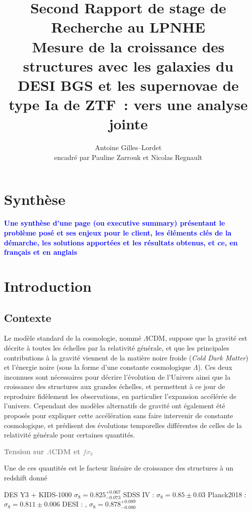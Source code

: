 \documentclass{book}
\title{Second Rapport de stage de Recherche au LPNHE\\\vspace{.3em} \large Mesure de la croissance des structures avec les galaxies du DESI BGS et les supernovae de type Ia de ZTF~: vers une analyse jointe}
\author{Antoine Gilles--Lordet\\ \vspace{.1em} \small encadré par Pauline Zarrouk et Nicolas Regnault }
\date{}
\newcommand{\todo}[1]{{\textcolor{gray}{\bf \large #1}}}
\newcommand{\consignes}[1]{{\textcolor{blue}{\bf \large #1}}}
\begin{document}
\maketitle

\tableofcontents

\chapter{Synthèse}

\consignes{Une synthèse d’une page (ou executive summary) présentant le problème posé et ses enjeux pour le client, les éléments clés de la démarche, les solutions apportées et les résultats obtenus, et ce, en français et en anglais}

\chapter{Introduction}

\section{Contexte}

Le modèle standard de la cosmologie, nommé $\Lambda$CDM, suppose que la gravité est décrite à toutes les échelles par la relativité générale, et que les principales contributions à la gravité viennent de la matière noire froide (\textit{Cold Dark Matter}) et l'énergie noire (sous la forme d'une constante cosmologique $\Lambda$). Ces deux inconnues sont nécessaires pour décrire l'évolution de l'Univers ainsi que la croissance des structures aux grandes échelles, et permettent à ce jour de reproduire fidèlement les observations, en particulier l'expansion accélérée de l'univers. Cependant des modèles alternatifs de gravité ont également été proposés pour expliquer cette accélération sans faire intervenir de constante cosmologique, et prédisent des évolutions temporelles différentes de celles de la relativité générale pour certaines quantités.

\todo{Tension sur $\Lambda$CDM et $f\sigma_8$}

Une de ces quantités est le facteur linéaire de croissance des structures à un redshift donné 

DES Y3 + KIDS-1000 \cite{dark_energy_survey_y3_2023} $\sigma_8 = 0.825^{+0.067}_{-0.073}$
SDSS IV : \cite{eboss_collaboration_completed_2021}$\sigma_8 = 0.85 \pm 0.03$
Planck2018 : \cite{planck_collaboration_planck_2020} $\sigma_8 = 0.811\pm 0.006$
DESI : \cite{chen_not_2024}, $\sigma_8 = 0.878^{+0.089}_{-0.080}$
\end{document}
